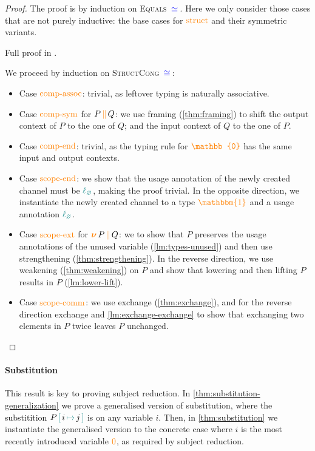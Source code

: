 \documentclass[sigplan,10pt,anonymous,review]{acmart}
\theoremstyle{definition}
\newcommand{\type}[1]{\textcolor{blue}{\operatorname{#1}}}
\newcommand{\constr}[1]{\textcolor{orange}{\operatorname{#1}}}
\newcommand{\func}[1]{\textcolor{teal}{\operatorname{#1}}}
\newcommand{\PO}{\constr{\mathbb{0}}}
\newcommand{\comp}[2]{#1 \, \constr{\parallel} \, #2}
\newcommand{\new}{\constr{\boldsymbol{\nu}} \,}
\newcommand{\unit}{\constr{\mathbbm{1}}}
\newcommand{\subst}[3]{#1 \, \func{[} \, #3 \, \func{\mapsto} \,#2 \, \func{]}}
\newcommand{\lz}{\func{\ell_{\varnothing}}}
\newcommand{\eq}[1]{\, \type{\simeq}_{#1} \,}
\newcommand{\eqeq}{\, \type{\cong} \,}
\begin{document}
\begin{proof}[Proof]
  The proof is by induction on \textsc{Equals} $\eq{}$.
  Here we only consider those cases that are not purely inductive: the base cases for $\constr{struct}$ and their symmetric variants.
\begin{anonsuppress}
Full proof in \cite{Zalakain2020Agda}.
\end{anonsuppress}
  We proceed by induction on \textsc{StructCong} $\eqeq$:
  \begin{itemize}
    \item
      Case $\constr{comp-assoc}$: trivial, as leftover typing is naturally associative.
    \item
      Case $\constr{comp-sym}$ for $\comp{P}{Q}$: we use framing (\autoref{thm:framing}) to shift the output context of $P$ to the one of $Q$; and the input context of $Q$ to the one of $P$.
    \item
      Case $\constr{comp-end}$: trivial, as the typing rule for $\PO$ has the same input and output contexts.
    \item
      Case $\constr{scope-end}$: we show that the usage annotation of the newly created channel must be $\lz$, making the proof trivial.
      In the opposite direction, we instantiate the newly created channel to a type $\unit$ and a usage annotation $\lz$.
    \item
      Case $\constr{scope-ext}$ for $\new \comp{P}{Q}$: we to show that $P$ preserves the usage annotations of the unused variable (\autoref{lm:types-unused}) and then use strengthening (\autoref{thm:strengthening}).
      In the reverse direction, we use weakening (\autoref{thm:weakening}) on $P$ and show that lowering and then lifting $P$ results in $P$ (\autoref{lm:lower-lift}).
    \item
      Case $\constr{scope-comm}$:
      we use exchange (\autoref{thm:exchange}), and for the reverse direction exchange and \autoref{lm:exchange-exchange} to show that exchanging two elements in $P$ twice leaves $P$ unchanged. \qedhere
  \end{itemize}
\end{proof}

\paragraph*{Substitution}
This result is key to proving subject reduction.
In \autoref{thm:substitution-generalization} we prove a generalised version of substitution, where the substitition $\subst{P}{j}{i}$ is on any variable $i$.
Then, in \autoref{thm:substitution} we instantiate the generalised version to the concrete case where $i$ is the most recently introduced variable $\constr{0}$, as required by subject reduction.
\end{document}
